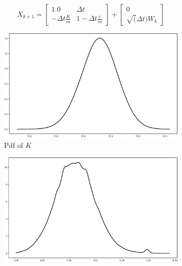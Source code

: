 \documentclass[]{elsarticle}
\begin{document}
\begin{equation}
X_{k+1} = 
\begin{bmatrix}
1.0 & \Delta t \\
- \Delta t \frac{K}{m} & 1 - \Delta t \frac{c}{m}
\end{bmatrix}
+
\begin{bmatrix}
0 \\
\sqrt(\Delta t) W_k
\end{bmatrix}
\end{equation}



\begin{figure}[!htb]
\centering
\begin{subfigure}{.49\textwidth}
\includegraphics[width=\linewidth,keepaspectratio]{./figs/Case00/Model2_k.eps}
\caption{Pdf of $K$}
\end{subfigure}
\begin{subfigure}{.49\textwidth}
\centering
\includegraphics[width=\linewidth,keepaspectratio]{./figs/Case00/Model2_c.eps}

\end{subfigure}
\end{figure}
\end{document}
